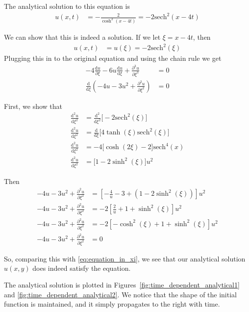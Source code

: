 \documentclass[twocolumn]{myarticle}
\numberwithin{equation}{section}
\newcommand{\sech}{\text{sech}}
\renewcommand{\d}{\mathrm{d}}
\begin{document}
The analytical solution to this equation is
\begin{align}
    u(x,t) &= - \frac{2}{\cosh^2(x - 4t)} = -2 \sech^2(x-4t)
\end{align}

We can show that this is indeed a solution.
If we let $ \xi = x - 4t $, then
\begin{align}
    u(x,t) &= u(\xi) = -2 \sech^2(\xi)
\end{align}
Plugging this in to the original equation and using the chain rule we get
\begin{align}
    -4 \frac{\d u}{\partial \xi} - 6 u \frac{\d u}{\d \xi} + \frac{\partial^3 u}{\partial \xi^3} &= 0
    \\
    \frac{\d}{\d \xi} \left( -4 u - 3 u^2 + \frac{\partial^2 u}{\partial \xi^2} \right) &= 0 \label{eq:equation_in_xi}
\end{align}

First, we show that
\begin{align}
    \frac{\d^2 u}{\d \xi^2} &= \frac{\d^2}{\d \xi^2} \big[ -2 \sech^2(\xi) \big]
    \\
    \frac{\d^2 u}{\d \xi^2} &= \frac{\d}{\d \xi} \big[ 4 \tanh(\xi) \sech^2(\xi) \big]
    \\
    \frac{\d^2 u}{\d \xi^2} &= -4 \big[ \cosh(2\xi) - 2 \big] \sech^4(x)
    \\
    \frac{\d^2 u}{\d \xi^2} &= \big[ 1 - 2\sinh^2(\xi) \big] u^2
\end{align}

Then
\begin{align}
    -4 u -3 u^2 + \frac{\partial^2 u}{\partial \xi^2} &= \left[ - \frac{4}{u} - 3 + \left( 1 - 2 \sinh^2(\xi) \right) \right] u^2
    \\
    -4 u -3 u^2 + \frac{\partial^2 u}{\partial \xi^2} &= -2 \left[ \frac{2}{u} + 1 + \sinh^2(\xi) \right] u^2
    \\
    -4 u -3 u^2 + \frac{\partial^2 u}{\partial \xi^2} &= -2 \left[ - \cosh^2(\xi) + 1 + \sinh^2(\xi) \right] u^2
    \\
    -4 u -3 u^2 + \frac{\partial^2 u}{\partial \xi^2} &= 0 
\end{align}

So, comparing this with \eqref{eq:equation_in_xi}, we see that our analytical solution $ u(x,y) $ does indeed satisfy the equation.

The analytical solution is plotted in Figures~\ref{fig:time_dependent_analytical1} and \ref{fig:time_dependent_analytical2}.
We notice that the shape of the initial function is maintained, and it simply propagates to the right with time.
\end{document}
